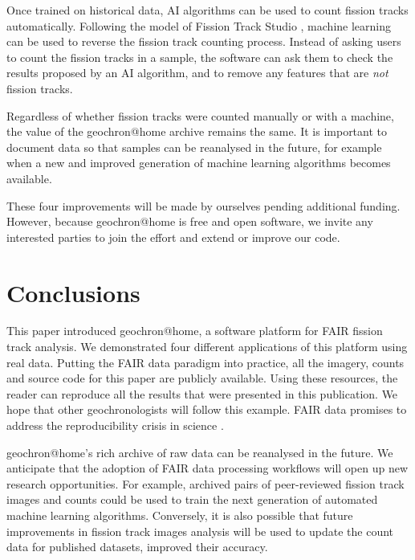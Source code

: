 \documentclass[gchron, manuscript]{copernicus}
\begin{document}
\begin{enumerate}
  Once trained on historical data, AI algorithms can be used to count
  fission tracks automatically. Following the model of Fission Track
  Studio \citep{gleadow2009, gleadow2019}, machine learning can be
  used to reverse the fission track counting process. Instead of
  asking users to count the fission tracks in a sample, the software
  can ask them to check the results proposed by an AI algorithm, and
  to remove any features that are \emph{not} fission tracks.\medskip

  Regardless of whether fission tracks were counted manually or with a
  machine, the value of the geochron@home archive remains the
  same. It is important to document data so that samples can be
  reanalysed in the future, for example when a new and improved
  generation of machine learning algorithms becomes available.
\end{enumerate}

These four improvements will be made by ourselves pending additional
funding. However, because geochron@home is free and open software, we
invite any interested parties to join the effort and extend or improve
our code.

\section{Conclusions}\label{sec:conclusions}

This paper introduced geochron@home, a software platform for
FAIR fission track analysis. We demonstrated four different
applications of this platform using real data. Putting the FAIR data
paradigm into practice, all the imagery, counts and source code for
this paper are publicly available. Using these resources, the reader
can reproduce all the results that were presented in this publication.
We hope that other geochronologists will follow this example.  FAIR
data promises to address the reproducibility crisis in science
\citep{miyakawa2020}.\medskip

geochron@home's rich archive of raw data can be reanalysed in
the future. We anticipate that the adoption of FAIR data processing
workflows will open up new research opportunities. For example,
archived pairs of peer-reviewed fission track images and counts could
be used to train the next generation of automated machine learning
algorithms. Conversely, it is also possible that future improvements
in fission track images analysis will be used to update the count data
for published datasets, improved their accuracy.\medskip
\end{document}
